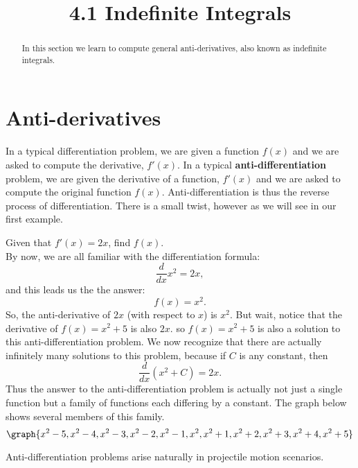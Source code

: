 \documentclass[handout]{ximera}
\title{4.1 Indefinite Integrals}
\begin{document}
\begin{abstract}
In this section we learn to compute general anti-derivatives, also known as indefinite integrals.
\end{abstract}

\maketitle

\section{Anti-derivatives}
In a typical differentiation problem, we are given a function $f(x)$ and
we are asked to compute the derivative, $f'(x)$.
In a typical \textbf{anti-differentiation} problem, we are given the derivative of a function, $f'(x)$
and we are asked to compute the original function $f(x)$.  Anti-differentiation is thus the reverse process of differentiation.
There is a small twist, however as we will see in our first example.

\begin{example}[example 1]
Given that $f'(x) = 2x$, find $f(x)$. \\
By now, we are all familiar with the differentiation formula:
\[
\frac{d}{dx} x^2 = 2x,
\]
and this leads us the the answer:
\[
f(x) = x^2.
\]
So, the anti-derivative of $2x$ (with respect to $x$) is $x^2$.
But wait, notice that the derivative of $f(x) = x^2 + 5$ is also $2x$.
so $f(x) = x^2 + 5$ is also a solution to this anti-differentiation problem.
We now recognize that there are actually infinitely many solutions to this problem, 
because if $C$ is any constant, then
\[
\frac{d}{dx} \left(x^2 + C\right) = 2x.
\]
Thus the answer to the anti-differentiation problem is actually not just a single function but a family of functions each differing by a constant.
The graph below shows several members of this family.
\[
\graph{x^2 - 5, x^2 - 4, x^2 - 3, x^2 - 2, x^2 - 1, x^2, x^2 +1, x^2 +2, x^2 +3, x^2 +4, x^2 +5}
\]

\end{example}

Anti-differentiation problems arise naturally in projectile motion scenarios.
\end{document}
